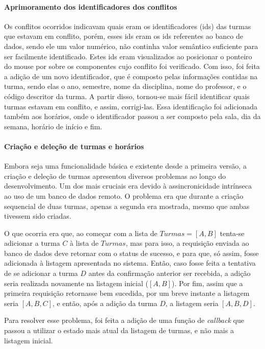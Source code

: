 \paragraph*{Aprimoramento dos identificadores dos conflitos}

Os conflitos ocorridos indicavam quais eram os identificadores (ids) das turmas que estavam em conflito, porém, esses ids eram os ids referentes ao banco de dados, sendo ele um valor numérico, não continha valor semântico suficiente para ser facilmente identificado. Estes ids eram visualizados ao posicionar o ponteiro do mouse por sobre os componentes cujo conflito foi verificado. Com isso, foi feita a adição de um novo identificador, que é composto pelas informações contidas na turma, sendo elas o ano, semestre, nome da disciplina, nome do professor, e o código descritor da turma. A partir disso, tornou-se mais fácil identificar quais turmas estavam em conflito, e assim, corrigi-las. Essa identificação foi adicionada também aos horários, onde o identificador passou a ser composto pela sala, dia da semana, horário de início e fim.

\paragraph*{Criação e deleção de turmas e horários}

Embora seja uma funcionalidade básica e existente desde a primeira versão, a criação e deleção de turmas apresentou diversos problemas ao longo do desenvolvimento. Um dos mais cruciais era devido à assincronicidade intrínseca ao uso de um banco de dados remoto. O problema era que durante a criação sequencial de duas turmas, apenas a segunda era mostrada, mesmo que ambas tivessem sido criadas.

O que ocorria era que, ao começar com a lista de $Turmas = [A, B]$ tenta-se adicionar a turma $C$ à lista de $Turmas$, mas para isso, a requisição enviada ao banco de dados deve retornar com o status de sucesso, e para que, só assim, fosse adicionada à listagem apresentada no sistema. Então, caso fosse feita a tentativa de se adicionar a turma $D$ antes da confirmação anterior ser recebida, a adição seria realizada novamente na listagem inicial ($[A, B]$). Por fim, assim que a primeira requisição retornasse bem sucedida, por um breve instante a listagem seria $[A, B, C]$, e então, após a adição da turma $D$, a listagem seria $[A, B, D]$.

Para resolver esse problema, foi feita a adição de uma função de \textit{callback} que passou a utilizar o estado mais atual da listagem de turmas, e não mais a listagem inicial.

